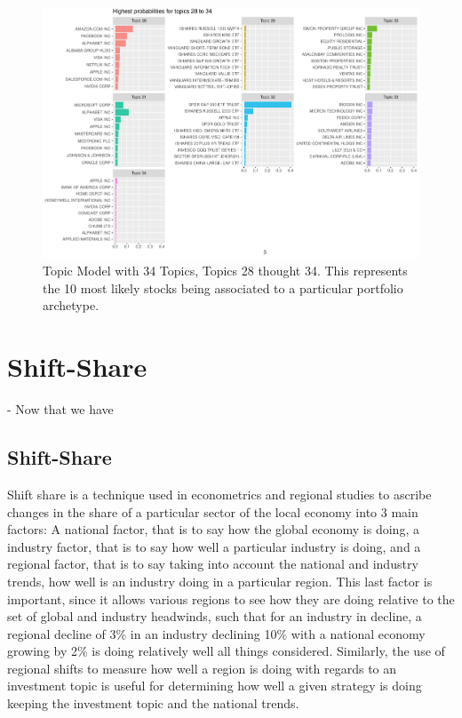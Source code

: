 \begin{figure}
	\centering
	\includegraphics[width=1\linewidth]{Figures/ChapterV/LDA34_28_34}
	\caption[Topic Model with 34 Topics, Topics 28 thought 34]{Topic Model with 34 Topics, Topics 28 thought 34. This represents the 10 most likely stocks being associated to a particular portfolio archetype.}
	\label{fig:lda342834}
\end{figure}
	
\section{Shift-Share}
- Now that we have 
\subsection{Shift-Share}

Shift share is a technique used in econometrics and regional studies to ascribe changes in the share of a particular sector of the local economy into 3 main factors: A national factor, that is to say how the global economy is doing, a industry factor, that is to say how well a particular industry is doing, and a regional factor, that is to say taking into account the national and industry trends, how well is an industry doing in a particular region.  This last factor is important, since it allows various regions to see how they are doing relative to the set of global and industry headwinds, such that for an industry in decline, a regional decline of 3\% in an industry declining 10\% with a national economy growing by 2\% is doing relatively well all things considered.  Similarly, the use of regional shifts to measure how well a region is doing with regards to an investment topic is useful for determining how well a given strategy is doing keeping the investment topic and the national trends. 

